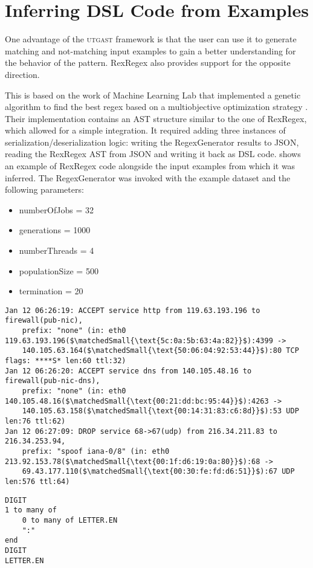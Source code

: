 \section{Inferring DSL Code from Examples} \label{sec:inferenceOfRexRegex}

One advantage of the \textsc{utgast} framework is that the user can use it to generate matching and not-matching input examples to gain a better understanding for the behavior of the pattern. RexRegex also provides support for the opposite direction.

This is based on the work of Machine Learning Lab that implemented a genetic algorithm to find the best regex based on a multiobjective optimization strategy \cite{bartoli2016inference}\cite{bartoli2016can}\cite{bartoli2015evolutionary}. Their implementation contains an AST structure similar to the one of RexRegex, which allowed for a simple integration. It required adding three instances of serialization/deserialization logic: writing the RegexGenerator results to JSON, reading the RexRegex AST from JSON and writing it back as DSL code.
 shows an example of RexRegex code alongside the input examples from which it was inferred. The RegexGenerator was invoked with the example dataset and the following parameters:

\begin{itemize}
    \setlength\itemsep{0em}
    \item numberOfJobs = 32
    \item generations = 1000
    \item numberThreads = 4
    \item populationSize = 500
    \item termination = 20
\end{itemize}

\FloatBarrier

\begin{listingBox}[float=htb,title={Inferred RexRegex code from examples},label=code:inferenceOfRexRegex]
    \begin{lstlisting}[basicstyle=\scriptsize,mathescape=true]
Jan 12 06:26:19: ACCEPT service http from 119.63.193.196 to firewall(pub-nic), 
    prefix: "none" (in: eth0 119.63.193.196($\matchedSmall{\text{5c:0a:5b:63:4a:82}}$):4399 -> 
    140.105.63.164($\matchedSmall{\text{50:06:04:92:53:44}}$):80 TCP flags: ****S* len:60 ttl:32)
Jan 12 06:26:20: ACCEPT service dns from 140.105.48.16 to firewall(pub-nic-dns), 
    prefix: "none" (in: eth0 140.105.48.16($\matchedSmall{\text{00:21:dd:bc:95:44}}$):4263 -> 
    140.105.63.158($\matchedSmall{\text{00:14:31:83:c6:8d}}$):53 UDP len:76 ttl:62)
Jan 12 06:27:09: DROP service 68->67(udp) from 216.34.211.83 to 216.34.253.94, 
    prefix: "spoof iana-0/8" (in: eth0 213.92.153.78($\matchedSmall{\text{00:1f:d6:19:0a:80}}$):68 -> 
    69.43.177.110($\matchedSmall{\text{00:30:fe:fd:d6:51}}$):67 UDP len:576 ttl:64)
    \end{lstlisting}
    \tcblower
    \begin{lstlisting}[style=rexregex]
DIGIT
1 to many of
    0 to many of LETTER.EN
    ":"
end
DIGIT
LETTER.EN
    \end{lstlisting}
\end{listingBox}

